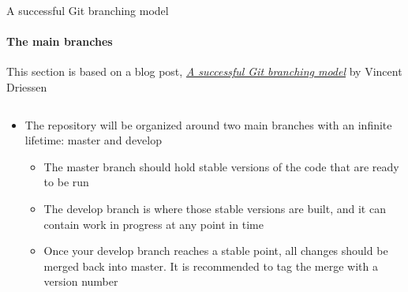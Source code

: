 \documentclass[10pt, aspectratio=169, xcolor=dvipsnames]{beamer}
\let\olditem\item
\renewcommand{\item}{%
\olditem\vspace{0.3em}}
\begin{document}
\begin{frame}[t]{A successful Git branching model}
    \framesubtitle{The main branches}
    \footnotesize This section is based on a blog post, \href{https://nvie.com/posts/a-successful-git-branching-model/}{\textit{A successful Git branching model}} by Vincent Driessen

    \normalsize\vspace{0.5em}
    \begin{columns}
        \begin{column}[t]{0.7\textwidth}
            \begin{itemize}
                \item The repository will be organized around two main branches with an infinite lifetime: \alert{master} and \alert{develop}
                \begin{itemize}
                    \item The \alert{master} branch should hold stable versions of the code that are ready to be run
                    \item The \alert{develop} branch is where those stable versions are built, and it can contain work in progress at any point in time
                    \item Once your \alert{develop} branch reaches a stable point, all changes should be merged back into \alert{master}. It is recommended to tag the merge with a version number
                \end{itemize}
            \end{itemize}    
        \end{column}
        

\end{columns}
\end{frame}
\end{document}

